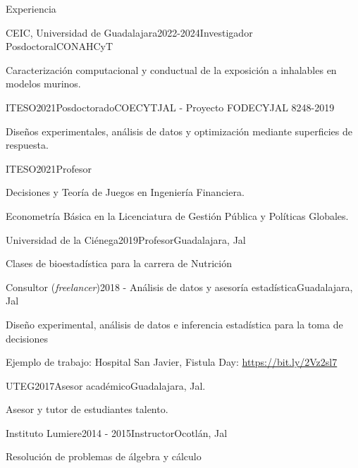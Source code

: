 \documentclass{resume} %
\begin{document}
\begin{rSection}{Experiencia}

\begin{rSubsection}{CEIC, Universidad de Guadalajara}{2022-2024}{Investigador Posdoctoral}{CONAHCyT}
	\item Caracterización computacional y conductual de la exposición a inhalables en modelos murinos.
\end{rSubsection}

\begin{rSubsection}{ITESO}{2021}{Posdoctorado}{COECYTJAL - Proyecto FODECYJAL 8248-2019}
\item Diseños experimentales, análisis de datos y optimización mediante superficies de respuesta.
\end{rSubsection}

\begin{rSubsection}{ITESO}{2021}{Profesor}{}
    \item Decisiones y Teoría de Juegos en Ingeniería Financiera.
    \item Econometría Básica en la Licenciatura de Gestión Pública y Políticas Globales.
\end{rSubsection}

\begin{rSubsection}{Universidad de la Ciénega}{2019}{Profesor}{Guadalajara, Jal}
\item Clases de bioestadística para la carrera de Nutrición
\end{rSubsection}

\begin{rSubsection}{Consultor ({\em freelancer})}{2018 - }{Análisis de datos y asesoría estadística}{Guadalajara, Jal}
\item Diseño experimental, análisis de datos e inferencia estadística para la toma de decisiones
\item Ejemplo de trabajo: Hospital San Javier, Fistula Day:  \url{https://bit.ly/2Vz2sl7}
\end{rSubsection}

\begin{rSubsection}{UTEG}{2017}{Asesor académico}{Guadalajara, Jal.}
	\item Asesor y tutor de estudiantes talento.
\end{rSubsection}


\begin{rSubsection}{Instituto Lumiere}{2014 - 2015}{Instructor}{Ocotlán, Jal}
	\item Resolución de problemas de álgebra y cálculo
\end{rSubsection}

\end{rSection}
\end{document}
